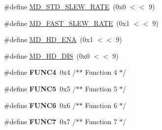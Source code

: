 \begin{DoxyCompactItemize}
\item 
\#define \hyperlink{group___i_o_c_o_n__17_x_x__40_x_x_ga190b92c2bbf82f91768ad526aaadc441}{M\+D\+\_\+\+S\+T\+D\+\_\+\+S\+L\+E\+W\+\_\+\+R\+A\+T\+E}~(0x0 $<$$<$ 9)
\item 
\#define \hyperlink{group___i_o_c_o_n__17_x_x__40_x_x_ga26dcdaed2ef64f84991cc59ae9370c80}{M\+D\+\_\+\+F\+A\+S\+T\+\_\+\+S\+L\+E\+W\+\_\+\+R\+A\+T\+E}~(0x1 $<$$<$ 9)
\item 
\#define \hyperlink{group___i_o_c_o_n__17_x_x__40_x_x_ga4fb2c193dc83d6b18a8afad131b2e139}{M\+D\+\_\+\+H\+D\+\_\+\+E\+N\+A}~(0x1 $<$$<$ 9)
\item 
\#define \hyperlink{group___i_o_c_o_n__17_x_x__40_x_x_ga324ed23a726e0788749899278b0ce61a}{M\+D\+\_\+\+H\+D\+\_\+\+D\+I\+S}~(0x0 $<$$<$ 9)
\item 
\hypertarget{group___i_o_c_o_n__17_x_x__40_x_x_ga769e96bef0ce818be7aa2cb0a0a67753}{\#define {\bfseries F\+U\+N\+C4}~0x4				/$\ast$$\ast$ Function 4  $\ast$/}\label{group___i_o_c_o_n__17_x_x__40_x_x_ga769e96bef0ce818be7aa2cb0a0a67753}

\item 
\hypertarget{group___i_o_c_o_n__17_x_x__40_x_x_gaa8d0feff604f4d347ce09d433de1b32d}{\#define {\bfseries F\+U\+N\+C5}~0x5				/$\ast$$\ast$ Function 5  $\ast$/}\label{group___i_o_c_o_n__17_x_x__40_x_x_gaa8d0feff604f4d347ce09d433de1b32d}

\item 
\hypertarget{group___i_o_c_o_n__17_x_x__40_x_x_ga3070395c343da6e051c4ebbcd3185a87}{\#define {\bfseries F\+U\+N\+C6}~0x6				/$\ast$$\ast$ Function 6	$\ast$/}\label{group___i_o_c_o_n__17_x_x__40_x_x_ga3070395c343da6e051c4ebbcd3185a87}

\item 
\hypertarget{group___i_o_c_o_n__17_x_x__40_x_x_ga25318daff6c777173bc54d6eeac7cb83}{\#define {\bfseries F\+U\+N\+C7}~0x7				/$\ast$$\ast$ Function 7	$\ast$/}\label{group___i_o_c_o_n__17_x_x__40_x_x_ga25318daff6c777173bc54d6eeac7cb83}

\end{DoxyCompactItemize}
